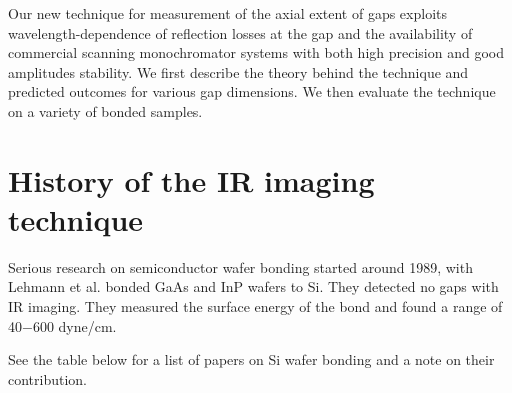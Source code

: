 \documentclass[osajnl,preprint,showpacs,superscriptaddress,12pt]{revtex4-1} %
\begin{document}
Our new technique for measurement of the axial extent of gaps exploits wavelength-dependence of reflection losses at the gap and the availability of commercial scanning monochromator systems with both high precision and good amplitudes stability.  We first describe the theory behind the technique and predicted outcomes for various gap dimensions.  We then evaluate the technique on a variety of bonded samples.  

\section{History of the IR imaging technique}

Serious research on semiconductor wafer bonding started around 1989, with Lehmann et al. \cite{1989JaJAP..28L2141L} bonded GaAs and InP wafers to Si.  They detected no gaps with IR imaging.  They measured the surface energy of the bond and found a range of 40$-$600 dyne/cm.  

See the table below for a list of papers on Si wafer bonding and a note on their contribution.
\end{document}
